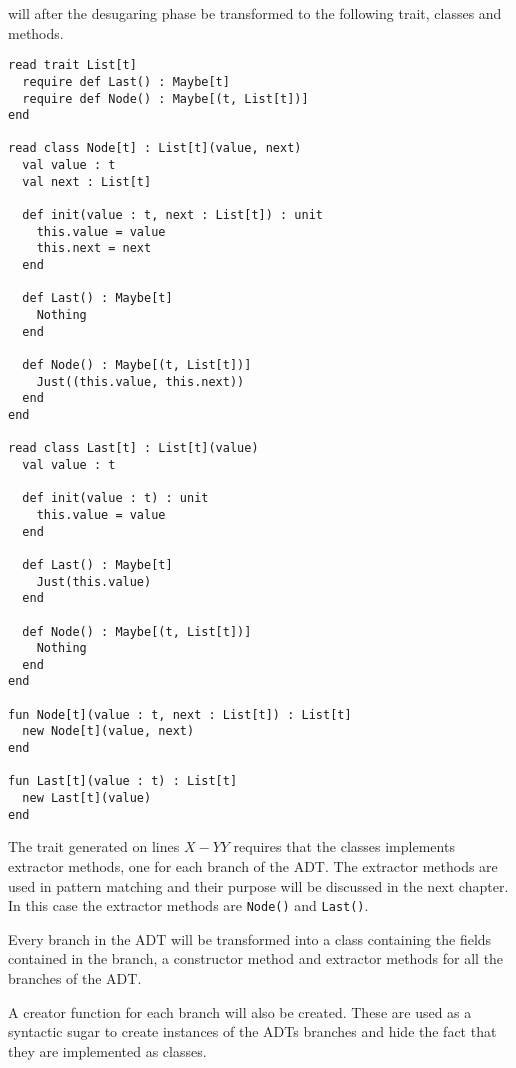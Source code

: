 \documentclass[10pt]{report}
\begin{document}
\par{\noindent will after the desugaring phase be transformed to the following trait, classes and methods.}

\begin{lstlisting}[language=encore,caption={Desugared linked list}]
read trait List[t]
  require def Last() : Maybe[t]
  require def Node() : Maybe[(t, List[t])]
end

read class Node[t] : List[t](value, next)
  val value : t
  val next : List[t]

  def init(value : t, next : List[t]) : unit
    this.value = value
    this.next = next
  end

  def Last() : Maybe[t]
    Nothing
  end

  def Node() : Maybe[(t, List[t])]
    Just((this.value, this.next))
  end
end

read class Last[t] : List[t](value)
  val value : t

  def init(value : t) : unit
    this.value = value
  end

  def Last() : Maybe[t]
    Just(this.value)
  end

  def Node() : Maybe[(t, List[t])]
    Nothing
  end
end

fun Node[t](value : t, next : List[t]) : List[t]
  new Node[t](value, next)
end

fun Last[t](value : t) : List[t]
  new Last[t](value)
end

\end{lstlisting}

\par{\noindent The trait generated on lines $X-YY$ requires that the classes implements extractor methods, one for each branch of the ADT\@. The extractor methods are used in pattern matching and their purpose will be discussed in the next chapter. In this case the extractor methods are \texttt{Node()} and \texttt{Last()}.\\}

\par{\noindent Every branch in the ADT will be transformed into a class containing the fields contained in the branch, a constructor method and extractor methods for all the branches of the ADT.\\}

\par{\noindent A creator function for each branch will also be created. These are used as a syntactic sugar to create instances of the ADTs branches and hide the fact that they are implemented as classes.}
\end{document}
